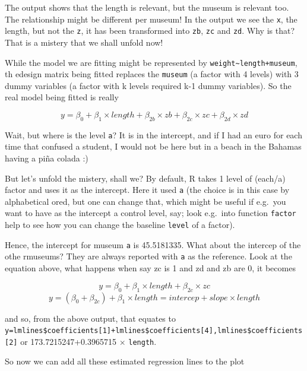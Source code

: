 \documentclass[
]{book}
\begin{document}
The output shows that the length is relevant, but the museum is relevant too. The relationship might be different per museum! In the output we see the \texttt{x}, the length, but not the \texttt{z}, it has been transformed into \texttt{zb}, \texttt{zc} and \texttt{zd}. Why is that? That is a mistery that we shall unfold now!

While the model we are fitting might be represented by \texttt{weight\textasciitilde{}length+museum}, th edesign matrix being fitted replaces the \texttt{museum} (a factor with 4 levels) with 3 dummy variables (a factor with k levels required k-1 dummy variables). So the real model being fitted is really

\[y=\beta_0+\beta_1 \times length + \beta_{2b} \times zb + \beta_{2c} \times zc + \beta_{2d} \times zd\]

Wait, but where is the level \texttt{a}? It is in the intercept, and if I had an euro for each time that confused a student, I would not be here but in a beach in the Bahamas having a piña colada :)

But let's unfold the mistery, shall we? By default, R takes 1 level of (each/a) factor and uses it as the intercept. Here it used \texttt{a} (the choice is in this case by alphabetical ored, but one can change that, which might be useful if e.g.~you want to have as the intercept a control level, say; look e.g.~into function \texttt{factor} help to see how you can change the baseline \texttt{level} of a factor).

Hence, the intercept for museum \texttt{a} is 45.5181335. What about the intercep of the othe rmuseums? They are always reported with \texttt{a} as the reference. Look at the equation above, what happens when say zc is 1 and zd and zb are 0, it becomes

\[y=\beta_0+\beta_1 \times length + \beta_{2c} \times zc \]
\[y=(\beta_0+\beta_{2c})+\beta_1 \times length = intercep + slope \times length\]

and so, from the above output, that equates to \texttt{y=lmlines\$coefficients{[}1{]}+lmlines\$coefficients{[}4{]},lmlines\$coefficients{[}2{]}} or 173.7215247+0.3965715 \(\times\) \texttt{length}.

So now we can add all these estimated regression lines to the plot
\end{document}
